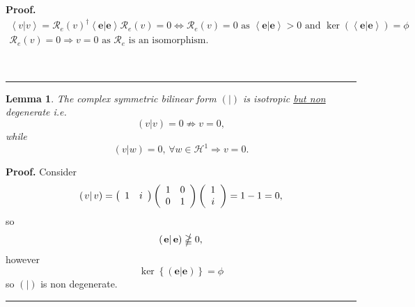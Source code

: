 \documentclass[aps,preprint]{revtex4}%
\newtheorem{lemma}[theorem]{Lemma}
\newenvironment{proof}[1][Proof]{\noindent\textbf{#1.} }{\ \rule{0.5em}{0.5em}}
\begin{document}
\begin{proof}%
\begin{gather}
\left\langle \left.  v\right\vert v\right\rangle =\mathcal{R}_{e}\left(
v\right)  ^{\dagger}\left\langle \left.  \mathbf{e}\right\vert \mathbf{e}%
\right\rangle \mathcal{R}_{e}\left(  v\right)  =0\Leftrightarrow
\mathcal{R}_{e}\left(  v\right)  =0\text{ as }\left\langle \left.
\mathbf{e}\right\vert \mathbf{e}\right\rangle >0\text{ and }\ker\left(
\left\langle \left.  \mathbf{e}\right\vert \mathbf{e}\right\rangle \right)
=\phi\\
\mathcal{R}_{e}\left(  v\right)  =0\Rightarrow v=0\text{ as }\mathcal{R}%
_{e}\text{ is an isomorphism.}%
\end{gather}

\end{proof}

\begin{lemma}
The complex symmetric bilinear form $\left(  \left.  {}\right\vert \right)  $
is \emph{isotropic \underline{\emph{but non}} degenerate i.e.}
\begin{equation}
\left(  \left.  v\right\vert v\right)  =0\nRightarrow v=0,
\end{equation}
while
\begin{equation}
\left(  \left.  v\right\vert w\right)  =0,\,\forall w\in\mathcal{H}%
^{1}\Rightarrow v=0.
\end{equation}

\end{lemma}

\begin{proof}
Consider%
\begin{equation}
\left(  \left.  v\right\vert v\right)  =\left(
\begin{array}
[c]{cc}%
1 & i
\end{array}
\right)  \left(
\begin{array}
[c]{cc}%
1 & 0\\
0 & 1
\end{array}
\right)  \left(
\begin{array}
[c]{c}%
1\\
i
\end{array}
\right)  =1-1=0,
\end{equation}
so
\begin{equation}
\left(  \left.  \mathbf{e}\right\vert \mathbf{e}\right)  \ngeqq0,
\end{equation}
however
\begin{equation}
\ker\left\{  \left(  \left.  \mathbf{e}\right\vert \mathbf{e}\right)
\right\}  =\phi
\end{equation}
so $\left(  \left.  {}\right\vert \right)  $ is non degenerate.
\end{proof}
\end{document}
